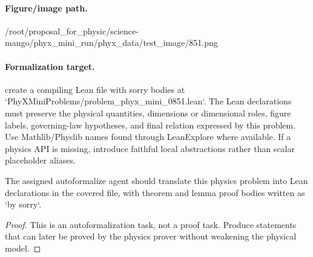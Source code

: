 \paragraph{Figure/image path.}
/root/proposal\_for\_physic/science-mango/phyx\_mini\_run/phyx\_data/test\_image/851.png

\paragraph{Formalization target.}
create a compiling Lean file with sorry bodies at `PhyXMiniProblems/problem\_phyx\_mini\_0851.lean`. The Lean declarations must preserve the physical quantities, dimensions or dimensional roles, figure labels, governing-law hypotheses, and final relation expressed by this problem.
Use Mathlib/Physlib names found through LeanExplore where available. If a physics API is missing, introduce faithful local abstractions rather than scalar placeholder aliases.

\begin{theorem}
\label{thm:physics:phyx_mini_0851:target}
The assigned autoformalize agent should translate this physics problem into Lean declarations in the covered file, with theorem and lemma proof bodies written as `by sorry`.
\end{theorem}
\begin{proof}
This is an autoformalization task, not a proof task. Produce statements that can later be proved by the physics prover without weakening the physical model.
\end{proof}

